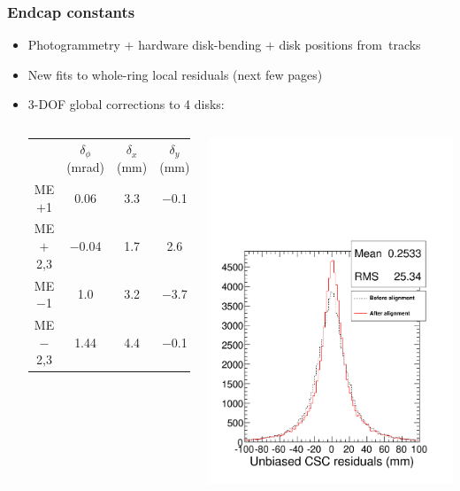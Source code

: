 \documentclass[compress]{beamer}
\begin{document}
\begin{frame}
\frametitle{Endcap constants}
\begin{itemize}
\item Photogrammetry $+$ hardware disk-bending $+$ disk positions \mbox{from tracks\hspace{-1 cm}}
\item New fits to whole-ring local residuals (next few pages)
\item 3-DOF global corrections to 4 disks:

\vspace{-0.5 cm}
\begin{columns}
\renewcommand{\arraystretch}{1.25}
\begin{tabular}{c c c c}
& $\delta_{\phi}$ (mrad) & $\delta_x$ (mm) & $\delta_y$ (mm) \\
ME$+$1 & 0.06 & 3.3 & $-$0.1 \\
ME$+$2,3 & $-$0.04 & 1.7 & 2.6 \\
ME$-$1 & 1.0 & 3.2 &$-$3.7 \\
ME$-$2,3 & 1.44 & 4.4 & $-$0.1
\end{tabular}
\includegraphics[width=\linewidth]{endcap_residuals.pdf}
\end{columns}


\end{itemize}
\end{frame}
\end{document}
